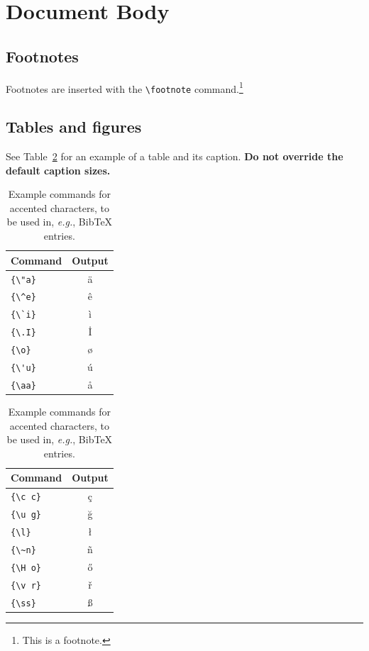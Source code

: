 \documentclass[11pt]{article}
\begin{document}
\section{Document Body}

\subsection{Footnotes}

Footnotes are inserted with the \verb|\footnote| command.\footnote{This is a footnote.}

\subsection{Tables and figures}

See Table~\ref{tab:accents} for an example of a table and its caption.
\textbf{Do not override the default caption sizes.}

\begin{table}
  \centering
  \begin{tabular}{lc}
    \hline
    \textbf{Command} & \textbf{Output} \\
    \hline
    \verb|{\"a}|     & {\"a}           \\
    \verb|{\^e}|     & {\^e}           \\
    \verb|{\`i}|     & {\`i}           \\
    \verb|{\.I}|     & {\.I}           \\
    \verb|{\o}|      & {\o}            \\
    \verb|{\'u}|     & {\'u}           \\
    \verb|{\aa}|     & {\aa}           \\\hline
  \end{tabular}
  \begin{tabular}{lc}
    \hline
    \textbf{Command} & \textbf{Output} \\
    \hline
    \verb|{\c c}|    & {\c c}          \\
    \verb|{\u g}|    & {\u g}          \\
    \verb|{\l}|      & {\l}            \\
    \verb|{\~n}|     & {\~n}           \\
    \verb|{\H o}|    & {\H o}          \\
    \verb|{\v r}|    & {\v r}          \\
    \verb|{\ss}|     & {\ss}           \\
    \hline
  \end{tabular}
  \caption{Example commands for accented characters, to be used in, \emph{e.g.}, Bib\TeX{} entries.}
  \label{tab:accents}
\end{table}
\end{document}
